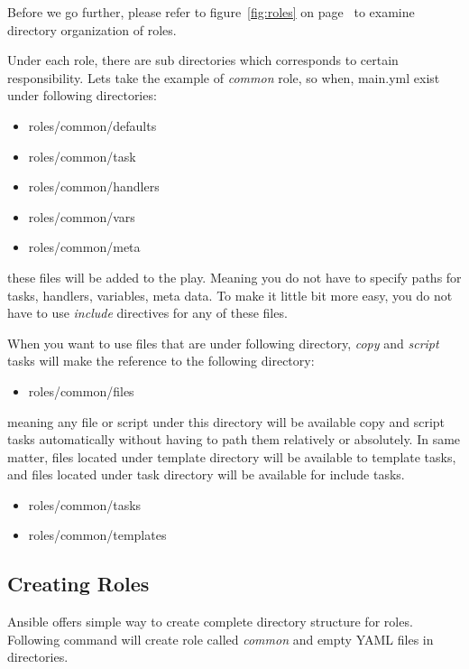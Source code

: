 \documentclass[10pt]{book}
\begin{document}
Before we go further, please refer to figure~\ref{fig:roles} on page~\pageref{fig:roles} to examine 
directory organization of roles.


 

Under each role, there are sub directories which corresponds to certain responsibility. Lets take the 
example of \emph{common} role, so when, main.yml exist under following directories:
 
 
 \begin{itemize}
\item roles/common/defaults
\item roles/common/task
\item roles/common/handlers
\item roles/common/vars
\item roles/common/meta
\end{itemize}

these files will be added to the play. Meaning you do not have to specify paths for tasks, handlers, 
variables, meta data. To make it little bit more easy, you do not have to use 
\emph{include} directives for any of these files.

When you want to use files that are under following directory, \emph{copy} and 
\emph{script} tasks will make the reference to the following directory:

\begin{itemize}
\item roles/common/files
\end{itemize}

meaning any file or script under this directory will be available copy and script tasks automatically without 
having to path them relatively or absolutely. In same matter, files located
under template directory will be available to template tasks, and files located 
under task directory will be available for include tasks.

\begin{itemize}
\item roles/common/tasks
\item roles/common/templates
\end{itemize}


\subsection{Creating Roles}
Ansible offers simple way to create complete directory structure for roles. 
Following command will create role called \emph{common} and empty YAML files in directories. 
\end{document}
